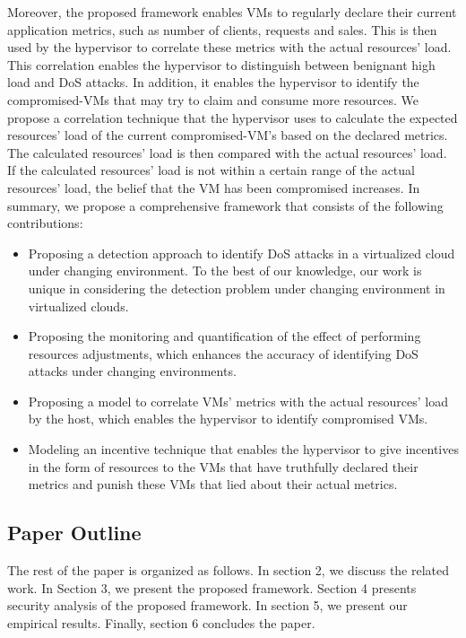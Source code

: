 \documentclass[twocolumn]{bmcart}%
\begin{document}
Moreover, the proposed framework enables VMs to regularly declare their current application metrics, such as number of clients, requests and sales. This is then used by the hypervisor to correlate these metrics with the actual resources' load. This correlation enables the hypervisor to distinguish between benignant high load and DoS attacks. In addition, it enables the hypervisor to identify the compromised-VMs that may try to claim and consume more resources. We propose a correlation technique that the hypervisor uses to calculate the expected resources' load of the current compromised-VM's based on the declared metrics. The calculated resources' load is then compared with the actual resources' load. If the calculated resources' load is not within a certain range of the actual resources' load, the belief that the VM has been compromised increases. In summary, we propose a comprehensive framework that consists of the following contributions:

\begin{itemize}

\item Proposing a detection approach to identify DoS attacks in a virtualized cloud under changing environment. To the best of our knowledge, our work is unique in considering the detection problem under changing environment in virtualized clouds.

\item Proposing the monitoring and quantification of the effect of performing resources adjustments, which enhances the accuracy of identifying DoS attacks under changing environments.

\item Proposing a model to correlate VMs' metrics with the actual resources' load by the host, which enables the hypervisor to identify compromised VMs.

\item Modeling an incentive technique that enables the hypervisor to give incentives in the form of resources to the VMs that have truthfully declared their metrics and punish these VMs that lied about their actual metrics.

\end{itemize}

\subsection*{Paper Outline}
The rest of the paper is organized as follows. In section 2, we discuss the related work. In Section 3, we present the proposed framework. Section 4 presents security analysis of the proposed framework. In section 5, we present our empirical results. Finally, section 6 concludes the paper.
\end{document}
